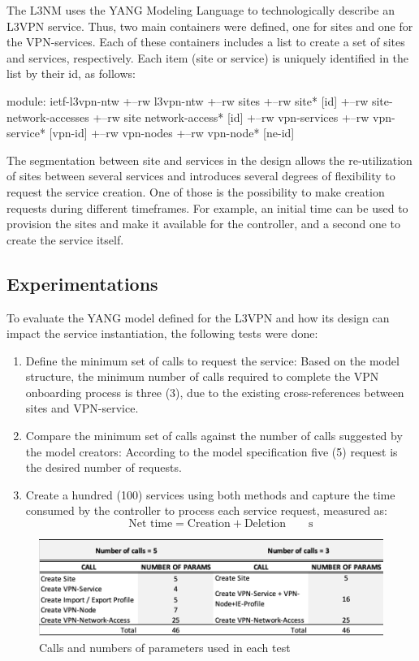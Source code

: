 \documentclass[conference]{IEEEtran}
\begin{document}
The L3NM uses the YANG Modeling Language to technologically describe an L3VPN service. Thus, two main containers were defined, one for sites and one for the VPN-services. Each of these containers includes a list to create a set of sites and services, respectively. Each item (site or service) is uniquely identified in the list by their id, as follows:

module: ietf-l3vpn-ntw
+--rw l3vpn-ntw
  +--rw sites
   +--rw site* [id]
    +--rw site-network-accesses
       +--rw site network-access* [id]
   +--rw vpn-services
       +--rw vpn-service* [vpn-id]
+--rw vpn-nodes
    +--rw vpn-node* [ne-id]

The segmentation between site and services in the design allows the re-utilization of sites between several services and introduces several degrees of flexibility to request the service creation. One of those is the possibility to make creation requests during different timeframes. For example, an initial time can be used to provision the sites and make it available for the controller, and a second one to create the service itself.

\subsection{Experimentations}
To evaluate the YANG model defined for the L3VPN and how its design can impact the service instantiation, the following tests were done:
\begin{enumerate}
    \item Define the minimum set of calls to request the service: Based on the model structure, the minimum number of calls required to complete the VPN onboarding process is three (3), due to the existing cross-references between sites and VPN-service.
    \item Compare the minimum set of calls against the number of calls suggested by the model creators: According to the model specification five (5) request is the desired number of requests. 
    \item Create a hundred (100) services using both methods and capture the time consumed by the controller to process each service request, measured as:
    \begin{equation}
         \si{\textrm{Net time}= \textrm{Creation} + \textrm{Deletion}\qquad \second}
    \end{equation}
\end{enumerate}

\begin{figure}
	\centering
		\includegraphics[width=\linewidth]{figure4.png}
	\caption{Calls and numbers of parameters used in each test}
	\label{FIG:4}
\end{figure}
\end{document}
